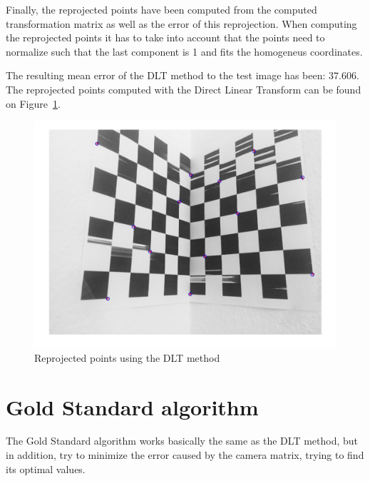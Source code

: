 \documentclass{ethz_report}
\begin{document}


Finally, the reprojected points have been computed from the computed transformation matrix as well as the error of this reprojection. When computing the reprojected points it has to take into account that the points need to normalize such that the last component is 1 and fits the homogeneus coordinates.



The resulting mean error of the DLT method to the test image has been: $37.606$.
The reprojected points computed with the Direct Linear Transform can be found on Figure~\ref{fig:results_dlt}.

\begin{figure}[H]
\centering
\includegraphics[width=.9\linewidth]{images/DLT_reprojected}
\caption{Reprojected points using the DLT method}
\label{fig:results_dlt}
\end{figure}

\section*{Gold Standard algorithm}

The Gold Standard algorithm works basically the same as the DLT method, but in addition, try to minimize the error caused by the camera matrix, trying to find its optimal values.


\end{document}
